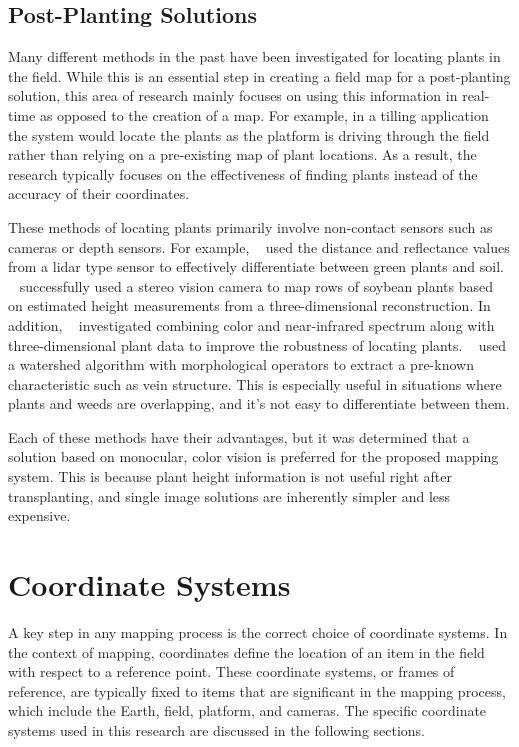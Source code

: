 \subsection{Post-Planting Solutions}

Many different methods in the past have been investigated for locating plants in the field.  While this is an essential step in creating a field map for a post-planting solution, this area of research mainly focuses on using this information in real-time as opposed to the creation of a map.  For example, in a tilling application the system would locate the plants as the platform is driving through the field rather than relying on a pre-existing map of plant locations.  As a result, the research typically focuses on the effectiveness of finding plants instead of the accuracy of their coordinates.  

These methods of locating plants primarily involve non-contact sensors such as cameras or depth sensors.  For example, ~\citep{Andujar:2013} used the distance and reflectance values from a \ac{lidar} type sensor to effectively differentiate between green plants and soil. ~\citep{Kise:2005} successfully used a stereo vision camera to map rows of soybean plants based on estimated height measurements from a three-dimensional reconstruction.  In addition, ~\citep{Panneton:2014} investigated combining color and near-infrared spectrum along with three-dimensional plant data to improve the robustness of locating plants.  ~\citep{Soille:2000} used a watershed algorithm with morphological operators to extract a pre-known characteristic such as vein structure.  This is especially useful in situations where plants and weeds are overlapping, and it's not easy to differentiate between them.

Each of these methods have their advantages, but it was determined that a solution based on monocular, color vision is preferred for the proposed mapping system.  This is because plant height information is not useful right after transplanting, and single image solutions are inherently simpler and less expensive. 

\section{Coordinate Systems}

A key step in any mapping process is the correct choice of coordinate systems.  In the context of mapping, coordinates define the location of an item in the field with respect to a reference point.  These coordinate systems, or frames of reference, are typically fixed to items that are significant in the mapping process, which include the Earth, field, platform, and cameras.  The specific coordinate systems used in this research are discussed in the following sections.

